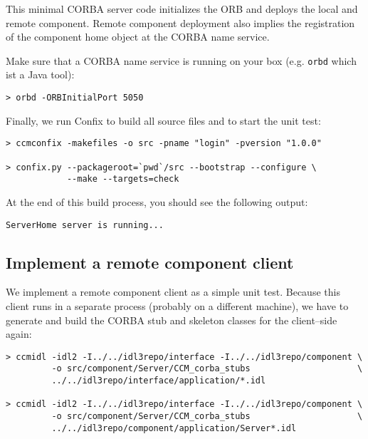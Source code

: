 This minimal CORBA server code initializes the ORB and deploys the local and
remote component. Remote component deployment also implies the registration of
the component home object at the CORBA name service. 

\vspace{3mm}
Make sure that a CORBA name service is running on your box (e.g. {\tt orbd}
which ist a Java tool):
\begin{footnotesize}
\begin{verbatim}
> orbd -ORBInitialPort 5050
\end{verbatim}
\end{footnotesize}

Finally, we run Confix to build all source files and to start the unit test:
\begin{footnotesize}
\begin{verbatim}
> ccmconfix -makefiles -o src -pname "login" -pversion "1.0.0"

> confix.py --packageroot=`pwd`/src --bootstrap --configure \
            --make --targets=check
\end{verbatim}
\end{footnotesize}

At the end of this build process, you should see the following output:
\begin{footnotesize}
\begin{verbatim}
ServerHome server is running...
\end{verbatim}
\end{footnotesize}


\subsection{Implement a remote component client}
\label{subsection:ImplementRemoteComponentClient}
We implement a remote component client as a simple unit test.
Because this client runs in a separate process (probably on a different machine), we
have to generate and build the CORBA stub and skeleton classes for the client--side 
again:
\begin{footnotesize}
\begin{verbatim}
> ccmidl -idl2 -I../../idl3repo/interface -I../../idl3repo/component \
         -o src/component/Server/CCM_corba_stubs                     \  
         ../../idl3repo/interface/application/*.idl

> ccmidl -idl2 -I../../idl3repo/interface -I../../idl3repo/component \
         -o src/component/Server/CCM_corba_stubs                     \
         ../../idl3repo/component/application/Server*.idl
\end{verbatim}
\end{footnotesize}

